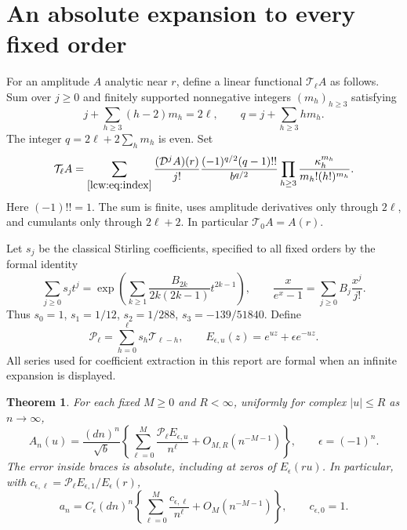 \documentclass[11pt,letterpaper]{article}
\newtheorem{theorem}{Theorem}[section]
\theoremstyle{remark}\newtheorem{remark}[theorem]{Remark}
\newcommand{\TT}{\mathcal T}\newcommand{\PP}{\mathcal P}
\begin{document}
\section{An absolute expansion to every fixed order}\label{lcw:sec:expansion}
For an amplitude $A$ analytic near $r$, define a linear functional $\TT_\ell A$ as follows. Sum over $j\ge0$ and finitely supported nonnegative integers $(m_h)_{h\ge3}$ satisfying
\begin{equation}\label{lcw:eq:index}
 j+\sum_{h\ge3}(h-2)m_h=2\ell,\qquad
 q=j+\sum_{h\ge3}hm_h.
\end{equation}
The integer $q=2\ell+2\sum_hm_h$ is even. Set
\begin{equation}\label{lcw:eq:operator}
 \TT_\ell A=
 \sum_{\eqref{lcw:eq:index}}
 \frac{(\DD^jA)(r)}{j!}
 \frac{(-1)^{q/2}(q-1)!!}{b^{q/2}}
 \prod_{h\ge3}\frac{\kappa_h^{m_h}}{m_h!(h!)^{m_h}}.
\end{equation}
Here $(-1)!!=1$. The sum is finite, uses amplitude derivatives only through $2\ell$, and cumulants only through $2\ell+2$. In particular $\TT_0A=A(r)$.

Let $s_j$ be the classical Stirling coefficients, specified to all fixed orders by the formal identity
\begin{equation}\label{lcw:eq:stirling}
 \sum_{j\ge0}s_jt^j=
 \exp\left(\sum_{k\ge1}\frac{B_{2k}}{2k(2k-1)}t^{2k-1}\right),
 \qquad
 \frac{x}{e^x-1}=\sum_{j\ge0}B_j\frac{x^j}{j!}.
\end{equation}
Thus $s_0=1$, $s_1=1/12$, $s_2=1/288$, $s_3=-139/51840$. Define
\begin{equation}\label{lcw:eq:Poperator}
 \PP_\ell=\sum_{h=0}^{\ell}s_h\TT_{\ell-h},\qquad
 E_{\epsilon,u}(z)=e^{uz}+\epsilon e^{-uz}.
\end{equation}
All series used for coefficient extraction in this report are formal when an infinite expansion is displayed.

\begin{theorem}\label{lcw:thm:absolute}
For each fixed $M\ge0$ and $R<\infty$, uniformly for complex $|u|\le R$ as $n\to\infty$,
\begin{equation}\label{lcw:eq:absolute}
 A_n(u)=\frac{(dn)^n}{\sqrt b}
 \left\{\sum_{\ell=0}^M\frac{\PP_\ell E_{\epsilon,u}}{n^\ell}
       +O_{M,R}(n^{-M-1})\right\},\qquad \epsilon=(-1)^n.
\end{equation}
The error inside braces is absolute, including at zeros of $E_\epsilon(ru)$.
In particular, with $c_{\epsilon,\ell}=\PP_\ell E_{\epsilon,1}/E_\epsilon(r)$,
\begin{equation}\label{lcw:eq:main}
 a_n=C_\epsilon(dn)^n
 \left\{\sum_{\ell=0}^M\frac{c_{\epsilon,\ell}}{n^\ell}
          +O_M(n^{-M-1})\right\},\qquad c_{\epsilon,0}=1.
\end{equation}
\end{theorem}
\end{document}
